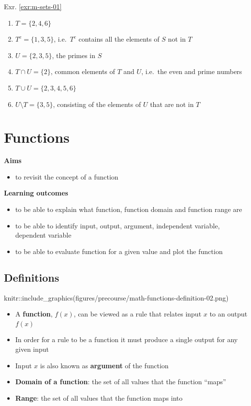 \documentclass[
]{book}
\providecommand{\tightlist}{%
  \setlength{\itemsep}{0pt}\setlength{\parskip}{0pt}}
\theoremstyle{definition}
\theoremstyle{definition}
\theoremstyle{definition}
\theoremstyle{remark}
\begin{document}
Exr. \ref{exr:m-sets-01}

\begin{enumerate}
\def\labelenumi{\alph{enumi})}
\tightlist
\item
  \(T = \{2, 4, 6\}\)
\item
  \(T^c = \{1, 3, 5\}\), i.e.~\(T^c\) contains all the elements of \(S\) not in \(T\)
\item
  \(U = \{2, 3, 5\}\), the primes in \(S\)
\item
  \(T \cap U = \{2\}\), common elements of \(T\) and \(U\), i.e.~the even and prime numbers
\item
  \(T \cup U = \{2, 3, 4, 5, 6\}\)
\item
  \(U \setminus T = \{3, 5\}\), consisting of the elements of \(U\) that are not in \(T\)
\end{enumerate}

\hypertarget{functions}{%
\chapter{Functions}\label{functions}}

\textbf{Aims}

\begin{itemize}
\tightlist
\item
  to revisit the concept of a function
\end{itemize}

\textbf{Learning outcomes}

\begin{itemize}
\tightlist
\item
  to be able to explain what function, function domain and function range are
\item
  to be able to identify input, output, argument, independent variable, dependent variable
\item
  to be able to evaluate function for a given value and plot the function
\end{itemize}

\hypertarget{definitions}{%
\section{Definitions}\label{definitions}}

knitr::include\_graphics(figures/precourse/math-functions-definition-02.png)

\begin{itemize}
\tightlist
\item
  A \textbf{function}, \(f(x)\), can be viewed as a rule that relates input \(x\) to an output \(f(x)\)
\item
  In order for a rule to be a function it must produce a single output for any given input
\item
  Input \(x\) is also known as \textbf{argument} of the function
\item
  \textbf{Domain of a function}: the set of all values that the function ``maps''
\item
  \textbf{Range}: the set of all values that the function maps into
\end{itemize}
\end{document}
